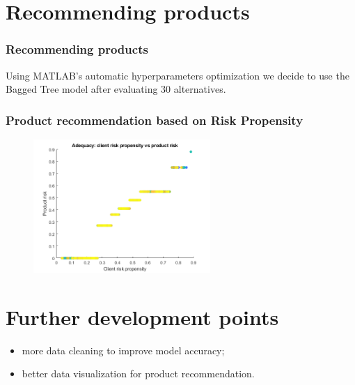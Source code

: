 \documentclass{beamer}
\begin{document}

\section{Recommending products}

\begin{frame}
\frametitle{Recommending products}
Using MATLAB's automatic hyperparameters optimization we decide to use the Bagged Tree model after evaluating 30 alternatives.
\end{frame}

\begin{frame}
    \frametitle{Product recommendation based on Risk Propensity}
    \begin{figure}
    	\centering
    	\includegraphics[width=0.6\textwidth]{recomm1}
    \end{figure}
\end{frame}

\section{Further development points}

\begin{frame}
    \begin{itemize}
        \item more data cleaning to improve model accuracy;
        \item better data visualization for product recommendation.
    \end{itemize}
\end{frame}
\end{document}
